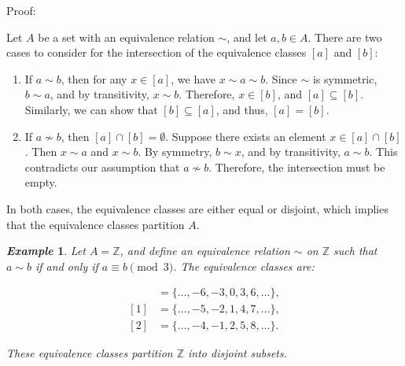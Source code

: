 \documentclass{report}
\newtheorem{example}{\textit{Example}}
\begin{document}
Proof:

Let $A$ be a set with an equivalence relation $\sim$, and let $a, b \in A$. There are two cases to consider for the intersection of the equivalence classes $[a]$ and $[b]$:


\begin{enumerate}

\item If $a \sim b$, then for any $x \in [a]$, we have $x \sim a \sim b$. Since $\sim$ is symmetric, $b \sim a$, and by transitivity, $x \sim b$. Therefore, $x \in [b]$, and $[a] \subseteq [b]$. Similarly, we can show that $[b] \subseteq [a]$, and thus, $[a] = [b]$.

\item If $a \not\sim b$, then $[a] \cap [b] = \emptyset$. Suppose there exists an element $x \in [a] \cap [b]$. Then $x \sim a$ and $x \sim b$. By symmetry, $b \sim x$, and by transitivity, $a \sim b$. This contradicts our assumption that $a \not \sim b$. Therefore, the intersection must be empty.

\end{enumerate}

In both cases, the equivalence classes are either equal or disjoint, which implies that the equivalence classes partition $A$.

\begin{example}
Let $A = \mathbb{Z}$, and define an equivalence relation $\sim$ on $\mathbb{Z}$ such that $a \sim b$ if and only if $a \equiv b \pmod{3}$. The equivalence classes are:

\begin{align*}
[0] &= \{\dots, -6, -3, 0, 3, 6, \dots\}, \\
[1] &= \{\dots, -5, -2, 1, 4, 7, \dots\}, \\
[2] &= \{\dots, -4, -1, 2, 5, 8, \dots\}.
\end{align*}

These equivalence classes partition $\mathbb{Z}$ into disjoint subsets.
\end{example}
\end{document}
